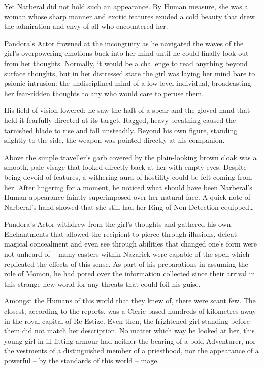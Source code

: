  

Yet Narberal did not hold such an appearance. By Human measure, she was a woman whose sharp manner and exotic features exuded a cold beauty that drew the admiration and envy of all who encountered her.

 

Pandora’s Actor frowned at the incongruity as he navigated the waves of the girl’s overpowering emotions back into her mind until he could finally look out from her thoughts. Normally, it would be a challenge to read anything beyond surface thoughts, but in her distressed state the girl was laying her mind bare to psionic intrusion: the undisciplined mind of a low level individual, broadcasting her fear-ridden thoughts to any who would care to peruse them.

 

His field of vision lowered; he saw the haft of a spear and the gloved hand that held it fearfully directed at its target. Ragged, heavy breathing caused the tarnished blade to rise and fall unsteadily. Beyond his own figure, standing slightly to the side, the weapon was pointed directly at his companion.

 

Above the simple traveller’s garb covered by the plain-looking brown cloak was a smooth, pale visage that looked directly back at her with empty eyes. Despite being devoid of features, a withering aura of hostility could be felt coming from her. After lingering for a moment, he noticed what should have been Narberal's Human appearance faintly superimposed over her natural face. A quick note of Narberal’s hand showed that she still had her Ring of Non-Detection equipped…

 

Pandora’s Actor withdrew from the girl’s thoughts and gathered his own. Enchantments that allowed the recipient to pierce through illusions, defeat magical concealment and even see through abilities that changed one’s form were not unheard of – many casters within Nazarick were capable of the spell which replicated the effects of this sense. As part of his preparations in assuming the role of Momon, he had pored over the information collected since their arrival in this strange new world for any threats that could foil his guise.

 

Amongst the Humans of this world that they knew of, there were scant few. The closest, according to the reports, was a Cleric based hundreds of kilometres away in the royal capital of Re-Estize. Even then, the frightened girl standing before them did not match her description. No matter which way he looked at her, this young girl in ill-fitting armour had neither the bearing of a bold Adventurer, nor the vestments of a distinguished member of a priesthood, nor the appearance of a powerful – by the standards of this world – mage.

